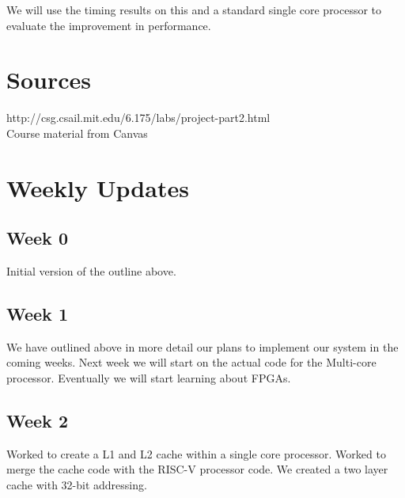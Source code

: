\documentclass{article}
\begin{document}
We will use the timing results on this and a standard single core processor to evaluate the improvement in performance. 

\section{Sources}

http://csg.csail.mit.edu/6.175/labs/project-part2.html
\\
Course material from Canvas

\section{Weekly Updates}
\subsection{Week 0}
Initial version of the outline above.
\subsection{Week 1}
We have outlined above in more detail our plans to implement our system in the coming weeks. Next week we will start on the actual code for the Multi-core processor. Eventually we will start learning about FPGAs.
\subsection{Week 2}
Worked to create a L1 and L2 cache within a single core processor. Worked to merge the cache code with the RISC-V processor code. We created a two layer cache with 32-bit addressing.
\end{document}
